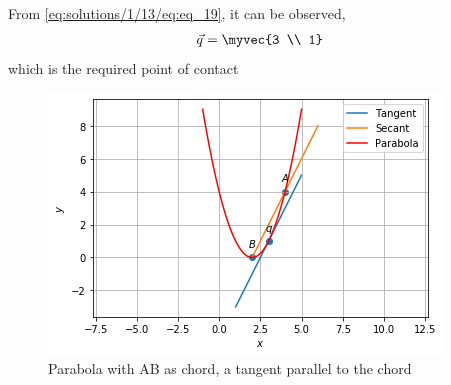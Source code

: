 From \eqref{eq:solutions/1/13/eq:eq_19}, it can be observed,
\begin{align}
    \vec{q} = \myvec{3 \\ 1}
\end{align}
which is the required point of contact
\begin{figure}[ht!]
    \centering
    \includegraphics[width=\columnwidth]{./solutions/1/13/Assignment_7_Plot.png}
    \caption{Parabola with AB as chord, a tangent parallel to the chord}
    \label{eq:solutions/1/13/Fig:1}
\end{figure} 
